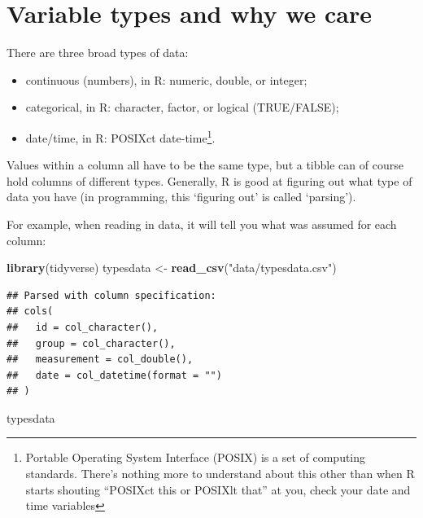 \documentclass[
  12pt,
  krantz2]{krantz}
\makeatletter
\newenvironment{Shaded}{\begin{snugshade}}{\end{snugshade}}
\newcommand{\KeywordTok}[1]{\textcolor[rgb]{0.13,0.29,0.53}{\textbf{#1}}}
\newcommand{\NormalTok}[1]{#1}
\newcommand{\StringTok}[1]{\textcolor[rgb]{0.31,0.60,0.02}{#1}}
\providecommand{\tightlist}{%
  \setlength{\itemsep}{0pt}\setlength{\parskip}{0pt}}
\newenvironment{kframe}{%
\medskip{}
\setlength{\fboxsep}{.8em}
 \def\at@end@of@kframe{}%
 \ifinner\ifhmode%
  \def\at@end@of@kframe{\end{minipage}}%
  \begin{minipage}{\columnwidth}%
 \fi\fi%
 \def\FrameCommand##1{\hskip\@totalleftmargin \hskip-\fboxsep
 \colorbox{shadecolor}{##1}\hskip-\fboxsep
     \hskip-\linewidth \hskip-\@totalleftmargin \hskip\columnwidth}%
 \MakeFramed {\advance\hsize-\width
   \@totalleftmargin\z@ \linewidth\hsize
   \@setminipage}}%
 {\par\unskip\endMakeFramed%
 \at@end@of@kframe}
\renewenvironment{Shaded}{\begin{kframe}}{\end{kframe}}
\makeatother
\begin{document}
\hypertarget{chap02-vartypes}{%
\section{Variable types and why we care}\label{chap02-vartypes}}


There are three broad types of data:

\begin{itemize}
\tightlist
\item
  continuous (numbers), in R: numeric, double, or integer;
\item
  categorical, in R: character, factor, or logical (TRUE/FALSE);
\item
  date/time, in R: POSIXct date-time\footnote{Portable Operating System Interface (POSIX) is a set of computing standards. There's nothing more to understand about this other than when R starts shouting ``POSIXct this or POSIXlt that'' at you, check your date and time variables}.
\end{itemize}

Values within a column all have to be the same type, but a tibble can of course hold columns of different types.
Generally, R is good at figuring out what type of data you have (in programming, this `figuring out' is called `parsing').

For example, when reading in data, it will tell you what was assumed for each column:

\begin{Shaded}
\begin{Highlighting}[]
\KeywordTok{library}\NormalTok{(tidyverse)}
\NormalTok{typesdata <-}\StringTok{ }\KeywordTok{read_csv}\NormalTok{(}\StringTok{"data/typesdata.csv"}\NormalTok{)}
\end{Highlighting}
\end{Shaded}

\begin{verbatim}
## Parsed with column specification:
## cols(
##   id = col_character(),
##   group = col_character(),
##   measurement = col_double(),
##   date = col_datetime(format = "")
## )
\end{verbatim}

\begin{Shaded}
\begin{Highlighting}[]
\NormalTok{typesdata}
\end{Highlighting}
\end{Shaded}
\end{document}
